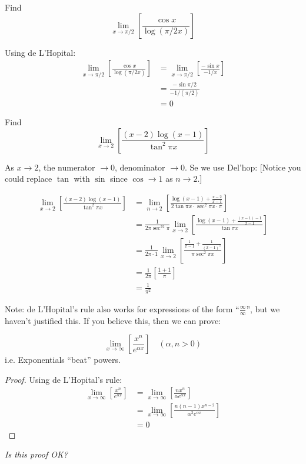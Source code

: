 \documentclass[twoside]{scrartcl}
\begin{document}
\begin{example}Find 
\[\lim_{x \to \pi/2} \left[\frac{\cos x}{\log(\pi/2x)}\right]\]

Using de L'Hopital:
\[
\begin{aligned}
  \lim_{x \to \pi/2} \left[\frac{\cos x}{\log(\pi/2x)}\right] &= \lim_{x \to \pi/2}\left[\frac{-\sin x}{-1/x}\right]\\
  &= \frac{-\sin\pi/2}{-1/(\pi/2)} \\ 
  &= 0 
\end{aligned}
\]
\end{example}\vspace*{5pt}





\begin{example}
Find 
\[\lim_{x \to 2} \left[\frac{(x-2)\log(x-1)}{\tan^2\pi x}\right]\]

As $x \to 2$, the numerator $\to 0$, denominator $\to 0$. Se we use Del'hop: [Notice you could replace $\tan$ with $\sin$ since $\cos \to 1$ as $n \to 2$.]

\[
\begin{aligned}
  \lim_{x \to 2} \left[\frac{(x-2)\log(x-1)}{\tan^2\pi x}\right] &= \lim_{n \to 2}\left[\frac{\log(x-1) + \frac{x-2}{x-1}}{2\tan\pi x\cdot \sec^2\pi x\cdot \pi}\right] \\
  &= \frac{1}{2\pi\sec^22\pi} \lim_{x \to 2} \left[\frac{\log(x-1) + \frac{(x-1)-1}{x-1}}{\tan \pi x}\right]\\
  &= \frac{1}{2\pi \cdot 1}\lim_{x \to 2} \left[\frac{\frac{1}{x-1} + \frac{1}{(x-1)^2}}{\pi\sec^2\pi x}\right]\\
  &= \frac{1}{2\pi}\left[\frac{1 + 1}{\pi}\right]\\
  &= \frac{1}{\pi^2}
\end{aligned}
\]	
\end{example}


Note: de L'Hopital's rule also works for expressions of the form ``$\frac{\infty}{\infty}$'', but we haven't justified this. If you believe this, then we can prove:
\begin{proposition} 
\[  \lim_{x \to \infty}\left[\frac{x^n}{e^{\alpha x}}\right] \quad (\alpha, n >0)\]
i.e. Exponentials ``beat'' powers. 
\end{proposition}

\begin{proof}Using de L'Hopital's rule: 
\[
\begin{aligned}
  \lim_{x \to \infty}\left[\frac{x^n}{e^{\alpha x}}\right] 
  &= \lim_{x \to \infty} \left[\frac{nx^n}{\alpha e^{\alpha x}}\right]\\
  &= \lim_{x \to \infty}\left[\frac{n(n-1)x^{n-2}}{\alpha^2e^{\alpha x}}\right]\\
  &= 0
\end{aligned}
\]
\end{proof}
\emph{Is this proof OK?}
\end{document}

